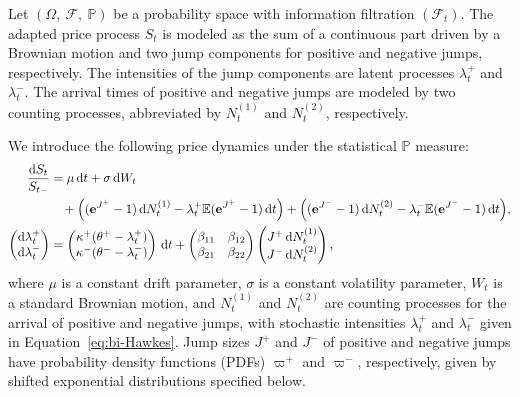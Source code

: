 \documentclass[11pt,a4paper]{article}
\numberwithin{equation}{section}
\theoremstyle{remark}
\theoremstyle{definition}
\newcommand{\E}{{\mathbb{E}}}
\newcommand{\e}{{\bf e}}
\newcommand{\dd}{{\rm d}}
\begin{document}
Let $\left(\Omega,\ \mathcal{F},\ \mathbb{P}\right)$ be a probability space with information filtration $\left(\mathcal{F}_t\right)$. The adapted price process $S_t$ is modeled as the sum of a continuous part driven by a Brownian motion and two jump components for positive and negative jumps, respectively. The intensities of the jump components are latent processes $\lambda^{+}_{t}$ and $\lambda^{-}_{t}$.
The arrival times of positive and negative jumps are modeled by two counting processes, abbreviated by $N^{(1)}_{t}$ and $N^{(2)}_{t}$, respectively.

We introduce the following price dynamics under the statistical $\mathbb P$ measure:
\begin{align}
  \frac{\dd S_t}{S_{t-}} &= \mu \, \dd t  + \sigma \, \dd W_t
     \label{eq:dS}\\
    &\phantom{=\,}
    + \Big((\e^{J^+}-1)\, \dd N_t^{(1)}- \lambda_t^+ \E(\e^{J^+}-1) \, \dd t \Big)
    + \Big((\e^{J^-}-1)\, \dd N_t^{(2)}- \lambda_t^- \E(\e^{J^-}-1)\,
      \dd t\Big), \nonumber \\%
  \begin{pmatrix}
    \dd \lambda_t^+\\
    \dd \lambda_t^-
  \end{pmatrix}
  &=
    \begin{pmatrix}
      \kappa^+ (\theta^+-\lambda_t^+)\\
      \kappa^- (\theta^--\lambda_t^-)
    \end{pmatrix}\, \dd t %
  +
  \begin{pmatrix}
    \beta_{11} & \beta_{12}\\
    \beta_{21} & \beta_{22}
  \end{pmatrix} %
                 \begin{pmatrix}
                   J^+\, \dd N_t^{(1)}\\
                   J^-\, \dd N_t^{(2)}
                 \end{pmatrix} \label{eq:bi-Hawkes},
\end{align}
where $\mu$ is a constant drift parameter, $\sigma$ is a constant volatility parameter, $W_t$ is a standard Brownian motion, and $N^{(1)}_t$ and $N^{(2)}_t$ are counting processes for the arrival of positive and negative jumps, with stochastic intensities $\lambda^+_t$ and $\lambda^-_t$ given in Equation~\eqref{eq:bi-Hawkes}. Jump sizes $J^+$ and $J^-$ of positive and negative jumps have probability density functions (PDFs) $\varpi^+$ and $\varpi^-$, respectively, given by shifted exponential distributions specified below.
\end{document}
